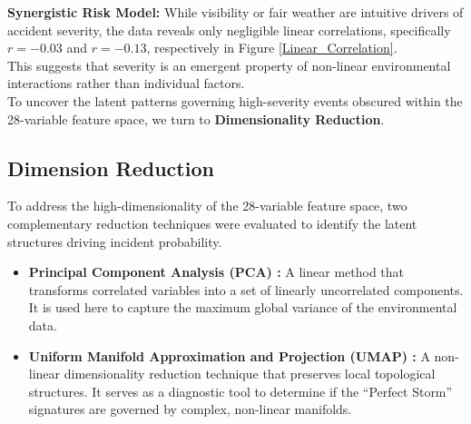 \documentclass[conference]{IEEEtran}
\begin{document}
\textbf{Synergistic Risk Model:} While visibility or fair weather are intuitive drivers of accident severity, the data reveals only negligible linear correlations, specifically $r = -0.03$ and $r = -0.13$, respectively in Figure \ref{Linear_Correlation}.\\
\indent This suggests that severity is an emergent property of non-linear environmental interactions rather than individual factors. \\
\indent To uncover the latent patterns governing high-severity events obscured within the 28-variable feature space, we turn to \textbf{Dimensionality Reduction}.

\vspace{2mm}

\subsection{\textbf{Dimension Reduction}}

To address the high-dimensionality of the 28-variable feature space, two complementary reduction techniques were evaluated to identify the latent structures driving incident probability.

\begin{itemize}
	\item \textbf{Principal Component Analysis (PCA) \cite{Pearson1901}:} A linear method that transforms correlated variables into a set of linearly uncorrelated components. It is used here to capture the maximum global variance of the environmental data.
	\item \textbf{Uniform Manifold Approximation and Projection (UMAP) \cite{McInnes2018}:} A non-linear dimensionality reduction technique that preserves local topological structures. It serves as a diagnostic tool to determine if the ``Perfect Storm'' signatures are governed by complex, non-linear manifolds.
\end{itemize}
\end{document}
